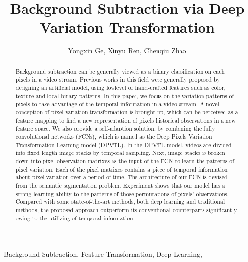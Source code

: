 \documentclass[journal]{IEEEtran}
\begin{document}
\title{Background Subtraction via Deep Variation Transformation}

\author{Yongxin Ge, 
        Xinyu Ren, 
        Chenqiu Zhao}



\maketitle



\begin{abstract}
Background subtraction can be generally viewed as a binary classification on each pixels in a video stream. 
Previous works in this field were generally proposed by designing an artificial model, using lowlevel or hand-crafted features such as color, texture and local binary patterns.
In this paper, we focus on the variation patterns of pixels to take advantage of the temporal information in a video stream. A novel conception of pixel variation transformation is brought up, which can be perceived as a feature mapping to find a new representation of pixels historical observations in a new feature space. 
We also provide a self-adaption solution, by combining the fully convolutional networks (FCNs), which is named as the Deep Pixels Variation Transformation Learning model (DPVTL). 
In the DPVTL model, videos are divided into fixed length image stacks by temporal sampling. Next, image stacks is broken down into pixel observation matrixes as the input of the FCN to learn the patterns of pixel variation. Each of the pixel matrixes contains a piece of temporal information about pixel variation over a period of time.  
The architecture of our FCN is devised from the semantic segmentation problem. 
Experiment shows that our model has a strong learning ability to the patterns of those permutations of pixels’ observations. Compared with some state-of-the-art methods, both deep learning and traditional methods, the proposed approach outperform its conventional counterparts significantly owing to the utilizing of temporal information.
\end{abstract}

\begin{IEEEkeywords} 
    Background Subtraction, Feature Transformation, Deep Learning,
\end{IEEEkeywords}
\end{document}
